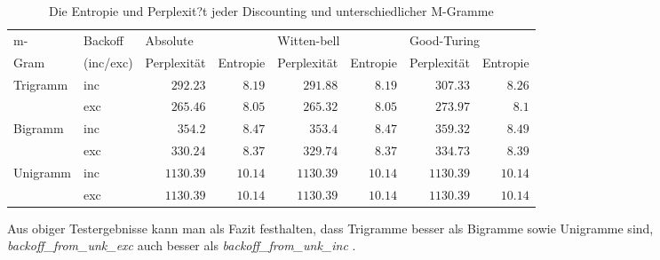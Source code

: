  
\begin{table}[h]
  \begin{center}
  \small\addtolength{\tabcolsep}{-5pt}
    \begin{tabular}{l|l|r|r|r|r|r|r}
     \toprule
     m- &Backoff &\multicolumn{2}{|l|}{Absolute}&\multicolumn{2}{|l|}{Witten-bell}&\multicolumn{2}{l}{Good-Turing}\\
	  \cline{3-8}
	  Gram&(inc/exc)&Perplexit\"at&Entropie&Perplexit\"at&Entropie&Perplexit\"at&Entropie\\
    \hline
    \hline
		Trigramm &inc 	& $292.23$ 	& $8.19$ 	& $291.88$ 	& $8.19$ 	& $307.33$ 	& $8.26$\\
				 		 &exc		& $265.46$ 	& $8.05$ 	& $265.32$ 	& $8.05$ 	& $273.97$ 	& $8.1$\\
		\hline
		Bigramm  &inc 	& $354.2$ 	& $8.47$ 	& $353.4$ 	& $8.47$ 	& $359.32$ 	& $8.49$\\
				 		 &exc		& $330.24$ 	& $8.37$ 	& $329.74$ 	& $8.37$ 	& $334.73$ 	& $8.39$\\
		\hline
		Unigramm &inc 	& $1130.39$ & $10.14$ & $1130.39$ & $10.14$ & $1130.39$ & $10.14$\\
				 		 &exc		& $1130.39$ & $10.14$ & $1130.39$ & $10.14$ & $1130.39$ & $10.14$\\
     \bottomrule

    \end{tabular}
  \end{center}
     \caption{Die Entropie und Perplexit?t jeder Discounting und unterschiedlicher M-Gramme}
\label{tab:table_3}
\end{table}
 
Aus obiger Testergebnisse kann man als Fazit festhalten, dass Trigramme besser als Bigramme sowie Unigramme sind, \emph{backoff\_from\_unk\_exc} auch besser als \emph{backoff\_from\_unk\_inc} .
 